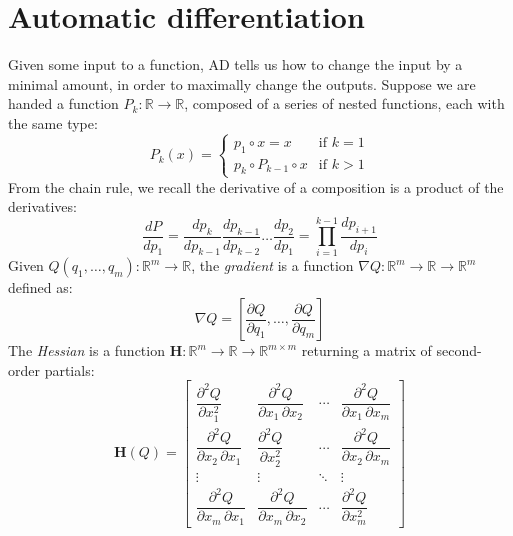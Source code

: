 \section{Automatic differentiation}\label{sec:automatic-differentiation}

Given some input to a function, AD tells us how to change the input by a minimal amount, in order to maximally change the outputs. Suppose we are handed a function $P_k: \mathbb{R}\rightarrow\mathbb{R}$, composed of a series of nested functions, each with the same type:
%
\begin{equation}
    P_k(x) = \begin{cases} p_1 \circ x = x &\text{if } k=1\\ p_k\circ P_{k-1} \circ x&\text{if } k > 1 \end{cases}
\end{equation}
%
From the chain rule, we recall the derivative of a composition is a product of the derivatives:
%
\begin{equation} \label{eq:sfun_chain_rule}
\frac{dP}{dp_1} = \frac{dp_k}{dp_{k-1}}\frac{dp_{k-1}}{dp_{k-2}}\dots\frac{dp_2}{dp_1}= {\displaystyle \prod_{i=1}^{k-1} \frac{dp_{i+1}}{dp_{i}}}
\end{equation}
%
Given $Q(q_1, \dots, q_m): \mathbb{R}^m\rightarrow\mathbb{R}$, the \textit{gradient} is a function $\nabla Q: \mathbb{R}^m\rightarrow\mathbb{R}\rightarrow\mathbb{R}^m$ defined as:
%
\begin{equation}
    \nabla Q = \left[ \frac{\partial Q}{\partial q_1}, \dots, \frac{\partial Q}{\partial q_m}\right]
\end{equation}
%
The \textit{Hessian} is a function $\mathbf{H}:\mathbb{R}^m\rightarrow\mathbb{R}\rightarrow\mathbb{R}^{m\times m}$ returning a matrix of second-order partials:
%
\begin{equation}
    \mathbf{H}(Q) = \begin{bmatrix}{\dfrac {\partial ^{2}Q}{\partial x_{1}^{2}}}&{\dfrac {\partial ^{2}Q}{\partial x_{1}\,\partial x_{2}}}&\cdots &{\dfrac {\partial ^{2}Q}{\partial x_{1}\,\partial x_{m}}}\\[2.2ex]{\dfrac {\partial ^{2}Q}{\partial x_{2}\,\partial x_{1}}}&{\dfrac {\partial ^{2}Q}{\partial x_{2}^{2}}}&\cdots &{\dfrac {\partial ^{2}Q}{\partial x_{2}\,\partial x_{m}}}\\[2.2ex]\vdots &\vdots &\ddots &\vdots \\[2.2ex]{\dfrac {\partial ^{2}Q}{\partial x_{m}\,\partial x_{1}}}&{\dfrac {\partial ^{2}Q}{\partial x_{m}\,\partial x_{2}}}&\cdots &{\dfrac {\partial ^{2}Q}{\partial x_{m}^{2}}}\end{bmatrix}
\end{equation}
